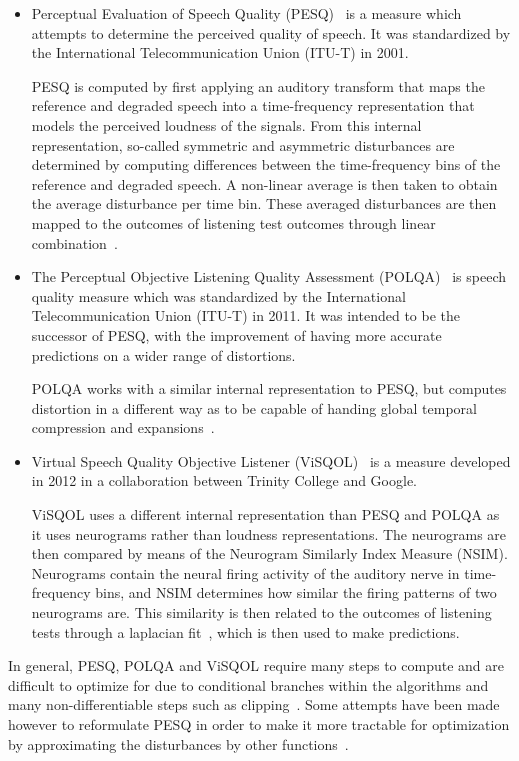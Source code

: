 \begin{itemize}
    \item 
    Perceptual Evaluation of Speech Quality (PESQ)~\cite{rix2001perceptual}
    is a measure which attempts to determine the perceived quality of speech.
    It was standardized by the International Telecommunication Union (ITU-T) in 2001.

    PESQ is computed by first applying an auditory transform that maps the reference and degraded speech into a 
    time-frequency representation that models the perceived loudness of the signals.
    From this internal representation, so-called symmetric and asymmetric disturbances are determined 
    by computing differences between the time-frequency bins of the reference and degraded speech. 
    A non-linear average is then taken to obtain the average disturbance per time bin.
    These averaged disturbances are then mapped to the outcomes of listening test outcomes through linear 
    combination~\cite{rix2001perceptual}.

    \item
    The Perceptual Objective Listening Quality Assessment (POLQA)~\cite{beerends2013perceptual} 
    is speech quality measure which was standardized by the International Telecommunication Union (ITU-T) in 2011. 
    It was intended to be the successor of PESQ, with the improvement of having more accurate predictions on a 
    wider range of distortions.

    POLQA works with a similar internal representation to PESQ, but computes distortion in a different way 
    as to be capable of handing global temporal compression and expansions~\cite{beerends2013perceptual}.

    \item
    Virtual Speech Quality Objective Listener (ViSQOL)~\cite{hines2012visqol,chinen2020visqol} 
    is a measure developed in 2012 in a collaboration between Trinity College and Google.

    ViSQOL uses a different internal representation than PESQ and POLQA as it uses neurograms 
    rather than loudness representations. 
    The neurograms are then compared by means of the Neurogram Similarly Index Measure (NSIM).
    Neurograms contain the neural firing activity of the auditory nerve in time-frequency bins, 
    and NSIM determines how similar the firing patterns of two neurograms are.
    This similarity is then related to the outcomes of listening tests through a laplacian fit~\cite{hines2012visqol}, 
    which is then used to make predictions.

\end{itemize}
In general, PESQ, POLQA and ViSQOL require many steps to compute and are difficult to optimize for due to 
conditional branches within the algorithms and many non-differentiable steps such as clipping~\cite{rix2001perceptual,beerends2013perceptual,hines2012visqol}. 
Some attempts have been made however to reformulate PESQ in order to make it more tractable for optimization 
by approximating the disturbances by other functions~\cite{kim2019end}.

